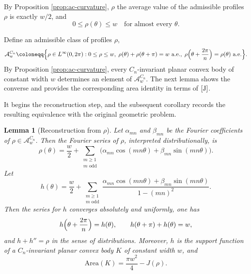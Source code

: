 \documentclass[11pt,letterpaper,reqno]{amsart}
\newtheorem{lemma}[theorem]{Lemma}
\providecommand{\Area}{\mathrm{Area}}
\begin{document}
\begin{explanation}
By Proposition \ref{prop:ac-curvature}, $\rho$ the average value of the admissible profiles $\rho$ is exactly $w/2$, and
\[
0 \le \rho(\theta) \le w \quad \text{for almost every } \theta.
\]
\end{explanation}
Define an admissible class of profiles $\rho$,
\[
\mathcal A_w^{C_n}\coloneqq
\Bigl\{\rho\in L^\infty(0,2\pi):
0\le \rho\le w,\;
\rho(\theta)+\rho(\theta+\pi)=w\text{ a.e.},\;
\rho\Bigl(\theta+\frac{2\pi}{n}\Bigr)=\rho(\theta)\text{ a.e.}
\Bigr\}.
\]
By Proposition \ref{prop:ac-curvature}, every $C_n$-invariant planar convex body of constant width $w$ determines an element of $\mathcal A_w^{C_n}$. The next lemma shows the converse and provides the corresponding area identity in terms of $\eqref{J}$. %
\begin{explanation}
    It begins the reconstruction step, and the subsequent corollary records the resulting equivalence with the original geometric problem.
\end{explanation}
    



\begin{lemma}[Reconstruction from $\rho$]
\label{lem:reconstruct-rho}
Let $\alpha_{mn}$ and $\beta_{mn}$ be the Fourier coefficients of $\rho\in\mathcal A_w^{C_n}$. Then the Fourier series of $\rho$, interpreted distributionally, is
\[
\rho(\theta)=\frac w2+\sum_{\substack{m\ge1\\m\text{ odd}}}
\bigl(\alpha_{mn}\cos(mn\theta)+\beta_{mn}\sin(mn\theta)\bigr).
\]
Let
\[
h(\theta)=\frac w2+\sum_{\substack{m\ge1\\m\text{ odd}}}
\frac{\alpha_{mn}\cos(mn\theta)+\beta_{mn}\sin(mn\theta)}{1-(mn)^2}.
\]
Then the series for $h$ converges absolutely and uniformly, one has
\[
h\Bigl(\theta+\frac{2\pi}{n}\Bigr)=h(\theta),
\qquad
h(\theta+\pi)+h(\theta)=w,
\]
and $h+h''=\rho$ in the sense of distributions. Moreover, $h$ is the support function of a $C_n$-invariant planar convex body $K$ of constant width $w$, and
\begin{equation} \label{Area}
    \Area(K)=\frac{\pi w^2}{4}-J(\rho).
\end{equation}


\end{lemma}
\end{document}

